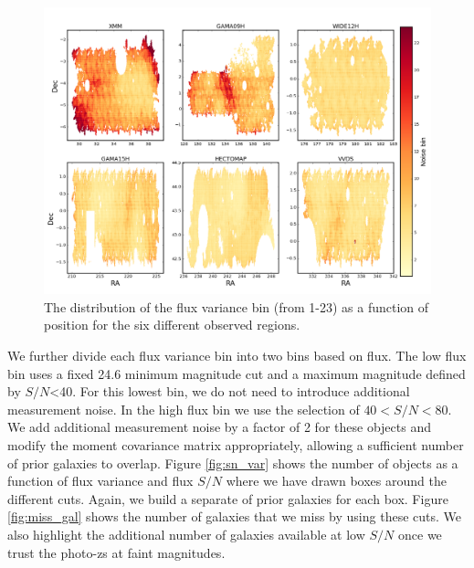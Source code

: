 \documentclass[useAMS,usenatbib]{mnras}
\begin{document}
\begin{figure}
    \includegraphics[width=\textwidth]{radec_noise_bin.png}
    \caption{
       The distribution of the flux variance bin (from 1-23) as a function of position for the six different observed regions.
    }
    \label{fig:radec_noise_bin}
\end{figure}


We further divide each flux variance bin into two bins based on flux. The low flux bin uses a fixed 24.6 minimum magnitude cut and a maximum magnitude defined by $S/N$<40.  For this lowest bin, we do not need to introduce additional measurement noise.  In the high flux bin we use the selection of $40<S/N<80$. We add additional measurement noise by a factor of 2 for these objects and modify the moment covariance matrix appropriately, allowing a sufficient number of prior galaxies to overlap.  Figure \ref{fig:sn_var} shows the number of objects as a function of flux variance and flux $S/N$ where we have drawn boxes around the different cuts.  Again, we build a separate of prior galaxies for each box.  Figure \ref{fig:miss_gal} shows the number of galaxies that we miss by using these cuts.  We also highlight the additional number of galaxies available at low $S/N$ once we trust the photo-zs at faint magnitudes.
\end{document}
